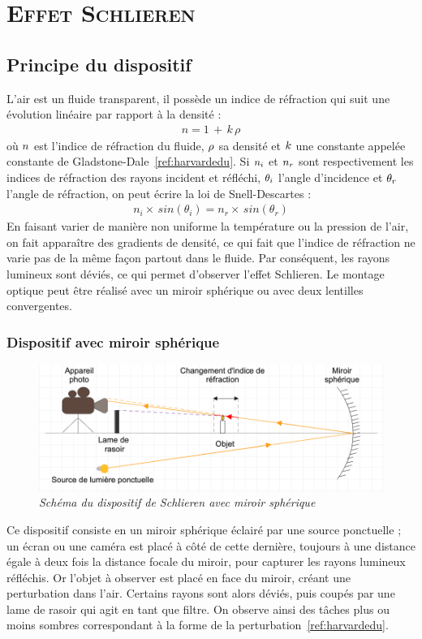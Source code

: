 \renewcommand{\chaptername}{\scshape Partie}
\chapter{\normalfont \scshape Effet Schlieren}
\section{Principe du dispositif}
L'air est un fluide transparent, il possède un indice de réfraction qui suit une évolution linéaire par rapport à la densité :
\begin{align}
	n = 1\,+\,k\,\rho
\end{align}
où $\mathnormal{n}$ est l'indice de réfraction du fluide, $\mathnormal{\rho}$ sa densité et $\mathnormal{k}$ une constante appelée constante de Gladstone-Dale~\ref{ref:harvardedu}. Si $\mathnormal{n_i}$ et $\mathnormal{n_r}$ sont respectivement les indices de réfraction des rayons incident et réfléchi, $\mathnormal{\theta_i}$ l'angle d'incidence et $\mathnormal{\theta_r}$ l'angle de réfraction, on peut écrire la loi de Snell-Descartes :
\begin{align}
	n_i\times\,sin(\theta_i) = n_r\times\,sin(\theta_r) 
\end{align}
En faisant varier de manière non uniforme la température ou la pression de l'air, on fait apparaître des gradients de densité, ce qui fait que l'indice de réfraction ne varie pas de la même façon partout dans le fluide. Par conséquent, les rayons lumineux sont déviés, ce qui permet d'observer l'effet Schlieren. Le montage optique peut être réalisé avec un miroir sphérique ou avec deux lentilles convergentes.
\subsection{Dispositif avec miroir sphérique}
\begin{figure}[H]
	\centering
	\includegraphics[scale = 0.4]{figures/schlieren_miroir.png}
	\caption{\small{\textit{Schéma du dispositif de Schlieren avec miroir sphérique}}}
	\label{fig:schlieren_miroir}
\end{figure}
Ce dispositif consiste en un miroir sphérique éclairé par une source ponctuelle ; un écran ou une caméra est placé à côté de cette dernière, toujours à une distance égale à deux fois la distance focale du miroir, pour capturer les rayons lumineux réfléchis. Or l’objet à observer est placé en face du miroir, créant une perturbation dans l’air. Certains rayons sont alors déviés, puis coupés par une lame de rasoir qui agit en tant que filtre. On observe ainsi des tâches plus ou moins sombres correspondant à la forme de la perturbation~\ref{ref:harvardedu}.
